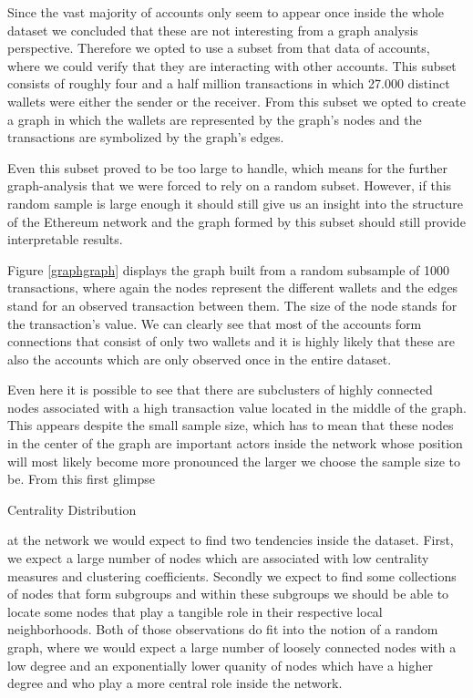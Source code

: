 Since the vast majority of accounts only seem to appear once inside the whole dataset we concluded that these are not interesting from a graph analysis perspective. Therefore we opted to use a subset from that data of accounts, where we could verify that they are interacting with other accounts. This subset consists of roughly four and a half million transactions in which 27.000 distinct wallets were either the sender or the receiver. From this subset we opted to create a graph in which the wallets are represented by the graph's nodes and the transactions are symbolized by the graph's edges.

Even this subset proved to be too large to handle, which means for the further graph-analysis that we were forced to rely on a random subset. However, if this random sample is large enough it should still give us an insight into the structure of the Ethereum network and the graph formed by this subset should still provide interpretable results.

Figure \ref{graphgraph} displays the graph built from a random subsample of 1000 transactions, where again the nodes represent the different wallets and the edges stand for an observed transaction between them. The size of the node stands for the transaction's value. We can clearly see that most of the accounts form connections that consist of only two wallets and it is highly likely that these are also the accounts which are only observed once in the entire dataset. 

Even here it is possible to see that there are subclusters of highly connected nodes associated with a high transaction value located in the middle of the graph. This appears despite the small sample size, which has to mean that these nodes in the center of the graph are important actors inside the network whose position will most likely become more pronounced the larger we choose the sample size to be. From this first glimpse{\par}

\begin{table}
\centering
\caption{Centrality Distribution}

\label{graphtable}
\end{table}

\noindent at the network we would expect to find two tendencies inside the dataset. First, we expect a large number of nodes which are associated with low centrality measures and clustering coefficients. Secondly we expect to find some collections of nodes that form subgroups and within these subgroups we should be able to locate some nodes that play a tangible role in their respective local neighborhoods. Both of those observations do fit into the notion of a random graph, where we would expect a large number of loosely connected nodes with a low degree and an exponentially lower quanity of nodes which have a higher degree and who play a more central role inside the network.

